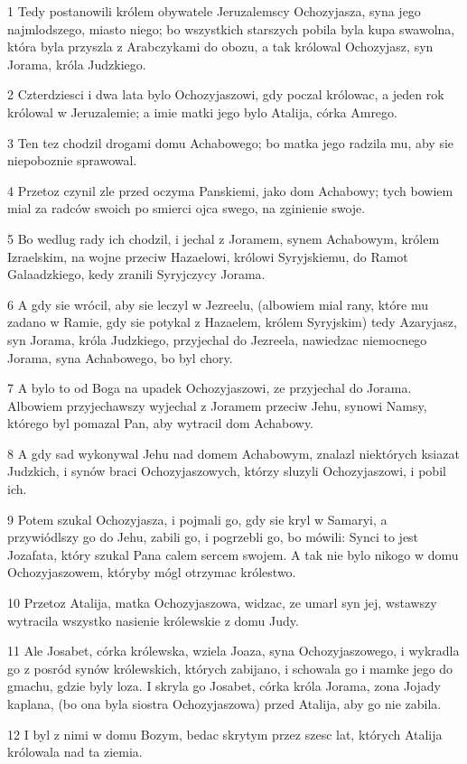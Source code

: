 \par 1 Tedy postanowili królem obywatele Jeruzalemscy Ochozyjasza, syna jego najmlodszego, miasto niego; bo wszystkich starszych pobila byla kupa swawolna, która byla przyszla z Arabczykami do obozu, a tak królowal Ochozyjasz, syn Jorama, króla Judzkiego.
\par 2 Czterdziesci i dwa lata bylo Ochozyjaszowi, gdy poczal królowac, a jeden rok królowal w Jeruzalemie; a imie matki jego bylo Atalija, córka Amrego.
\par 3 Ten tez chodzil drogami domu Achabowego; bo matka jego radzila mu, aby sie niepoboznie sprawowal.
\par 4 Przetoz czynil zle przed oczyma Panskiemi, jako dom Achabowy; tych bowiem mial za radców swoich po smierci ojca swego, na zginienie swoje.
\par 5 Bo wedlug rady ich chodzil, i jechal z Joramem, synem Achabowym, królem Izraelskim, na wojne przeciw Hazaelowi, królowi Syryjskiemu, do Ramot Galaadzkiego, kedy zranili Syryjczycy Jorama.
\par 6 A gdy sie wrócil, aby sie leczyl w Jezreelu, (albowiem mial rany, które mu zadano w Ramie, gdy sie potykal z Hazaelem, królem Syryjskim) tedy Azaryjasz, syn Jorama, króla Judzkiego, przyjechal do Jezreela, nawiedzac niemocnego Jorama, syna Achabowego, bo byl chory.
\par 7 A bylo to od Boga na upadek Ochozyjaszowi, ze przyjechal do Jorama. Albowiem przyjechawszy wyjechal z Joramem przeciw Jehu, synowi Namsy, którego byl pomazal Pan, aby wytracil dom Achabowy.
\par 8 A gdy sad wykonywal Jehu nad domem Achabowym, znalazl niektórych ksiazat Judzkich, i synów braci Ochozyjaszowych, którzy sluzyli Ochozyjaszowi, i pobil ich.
\par 9 Potem szukal Ochozyjasza, i pojmali go, gdy sie kryl w Samaryi, a przywiódlszy go do Jehu, zabili go, i pogrzebli go, bo mówili: Synci to jest Jozafata, który szukal Pana calem sercem swojem. A tak nie bylo nikogo w domu Ochozyjaszowem, któryby mógl otrzymac królestwo.
\par 10 Przetoz Atalija, matka Ochozyjaszowa, widzac, ze umarl syn jej, wstawszy wytracila wszystko nasienie królewskie z domu Judy.
\par 11 Ale Josabet, córka królewska, wziela Joaza, syna Ochozyjaszowego, i wykradla go z posród synów królewskich, których zabijano, i schowala go i mamke jego do gmachu, gdzie byly loza. I skryla go Josabet, córka króla Jorama, zona Jojady kaplana, (bo ona byla siostra Ochozyjaszowa) przed Atalija, aby go nie zabila.
\par 12 I byl z nimi w domu Bozym, bedac skrytym przez szesc lat, których Atalija królowala nad ta ziemia.

